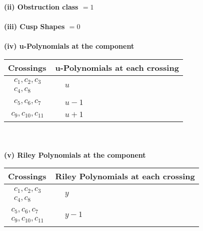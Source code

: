 \documentclass[1p]{elsarticle_modified}
\theoremstyle{definition}
\begin{document}
\flushleft \textbf{(ii) Obstruction class $= 1$}\\~\\
\flushleft \textbf{(iii) Cusp Shapes $= 0$}\\~\\
\newpage\renewcommand{\arraystretch}{1}
\flushleft \textbf{(iv) u-Polynomials at the component}\newline \\
\begin{tabular}{m{50pt}|m{274pt}}
Crossings & \hspace{64pt}u-Polynomials at each crossing \\
\hline $$\begin{aligned}c_{1},c_{2},c_{3}\\c_{4},c_{8}\end{aligned}$$&$\begin{aligned}
&u
\end{aligned}$\\
\hline $$\begin{aligned}c_{5},c_{6},c_{7}\end{aligned}$$&$\begin{aligned}
&u-1
\end{aligned}$\\
\hline $$\begin{aligned}c_{9},c_{10},c_{11}\end{aligned}$$&$\begin{aligned}
&u+1
\end{aligned}$\\
\hline
\end{tabular}\\~\\
\newpage\renewcommand{\arraystretch}{1}
\flushleft \textbf{(v) Riley Polynomials at the component}\newline \\
\begin{tabular}{m{50pt}|m{274pt}}
Crossings & \hspace{64pt}Riley Polynomials at each crossing \\
\hline $$\begin{aligned}c_{1},c_{2},c_{3}\\c_{4},c_{8}\end{aligned}$$&$\begin{aligned}
&y
\end{aligned}$\\
\hline $$\begin{aligned}c_{5},c_{6},c_{7}\\c_{9},c_{10},c_{11}\end{aligned}$$&$\begin{aligned}
&y-1
\end{aligned}$\\
\hline
\end{tabular}\\~\\
\end{document}
